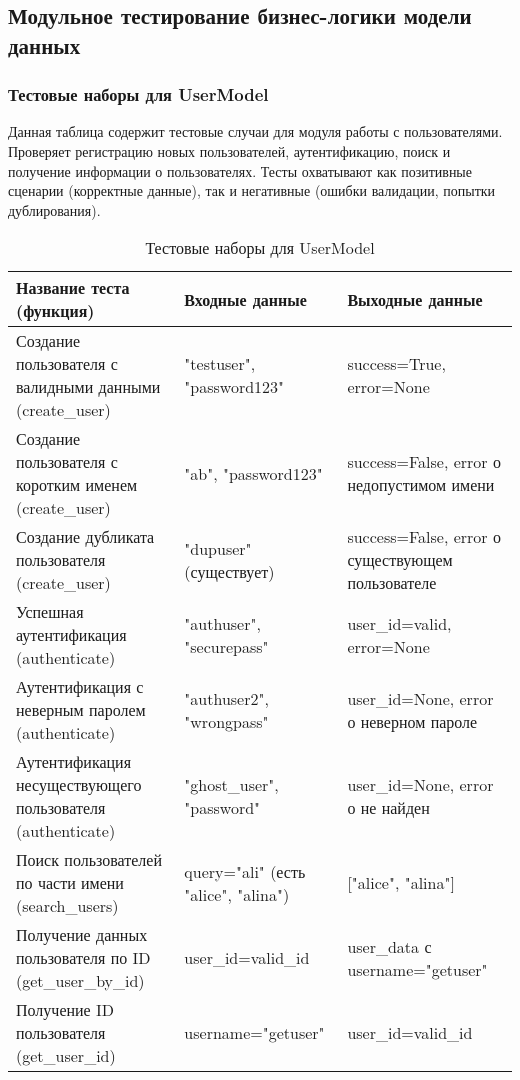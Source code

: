 \subsection{Модульное тестирование бизнес-логики модели данных}

\subsubsection{Тестовые наборы для UserModel}

Данная таблица содержит тестовые случаи для модуля работы с пользователями. Проверяет регистрацию новых пользователей, аутентификацию, поиск и получение информации о пользователях. Тесты охватывают как позитивные сценарии (корректные данные), так и негативные (ошибки валидации, попытки дублирования).

\begin{xltabular}{\linewidth}{|X|X|X|}
	\caption{Тестовые наборы для UserModel\label{usermodel-tests}}\\ \hline
	\centrow Название теста (функция) & \centrow Входные данные & \centrow Выходные данные \\ \hline
	Создание пользователя с валидными данными (create\_user) & "testuser", "password123" & success=True, error=None \\ \hline
	Создание пользователя с коротким именем (create\_user) & "ab", "password123" & success=False, error о недопустимом имени \\ \hline
	Создание дубликата пользователя (create\_user) & "dupuser" (существует) & success=False, error о существующем пользователе \\ \hline
	Успешная аутентификация (authenticate) & "authuser", "securepass" & user\_id=valid, error=None \\ \hline
	Аутентификация с неверным паролем (authenticate) & "authuser2", "wrongpass" & user\_id=None, error о неверном пароле \\ \hline
	Аутентификация несуществующего пользователя (authenticate) & "ghost\_user", "password" & user\_id=None, error о не найден \\ \hline
	Поиск пользователей по части имени (search\_users) & query="ali" (есть "alice", "alina") & ["alice", "alina"] \\ \hline
	Получение данных пользователя по ID (get\_user\_by\_id) & user\_id=valid\_id & user\_data с username="getuser" \\ \hline
	Получение ID пользователя (get\_user\_id) & username="getuser" & user\_id=valid\_id \\ \hline
\end{xltabular}

